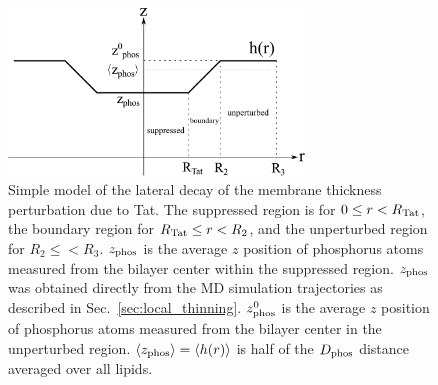 \begin{figure}[htbp]
  \centering
  \includegraphics[width=0.7\textwidth]{./figures/Tat/MMs/linear_model}
  \caption[Simple model of the lateral decay of the membrane thickness 
  perturbation due to Tat]
  {Simple model of the lateral decay of the membrane thickness 
  perturbation due to Tat. The suppressed region is for $0 \leq r < R_\textrm{Tat}$,
  the boundary region for $R_\textrm{Tat} \leq r < R_2$, and the unperturbed
  region for $R_2 \leq < R_3$. $z_\textrm{phos}$ is the average $z$ position of
  phosphorus atoms measured from the bilayer center within the suppressed region.
  $z_\textrm{phos}$ was obtained directly from the MD simulation trajectories as described in 
  Sec.~\ref{sec:local_thinning}. $z_\textrm{phos}^0$ is the average $z$ position of 
  phosphorus atoms measured from the bilayer center in the unperturbed region.
  $\langle z_\textrm{phos}\rangle = \langle h(r)\rangle$ is half of the
  $D_\text{phos}$ distance averaged over all lipids.}
  \label{fig:linear_model}
\end{figure}

